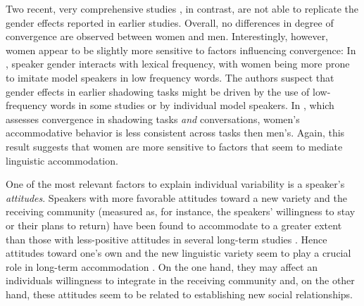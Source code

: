 \documentclass[output=paper,
modfonts
]{langscibook}
\begin{document}
% 
% 
% 
% 
Two recent, very comprehensive studies \cite{pardo_phonetic_2017,pardo_comparison_2018}, in contrast, are not able to replicate the gender effects reported in earlier studies. Overall, no differences in degree of convergence are observed between women and men. Interestingly, however, women appear to be slightly more sensitive to factors influencing convergence: In \cite{pardo_phonetic_2017}, speaker gender interacts with lexical frequency, with women being more prone to imitate model speakers in low frequency words. The authors suspect that gender effects in earlier shadowing tasks might be driven by the use of low-frequency words in some studies or by individual model speakers. In \cite{pardo_comparison_2018}, which assesses convergence in shadowing tasks \textit{and} conversations, women's accommodative behavior is less consistent across tasks then men's. Again, this result suggests that women are more sensitive to factors that seem to mediate linguistic accommodation.
% 
% 

One of the most relevant factors to explain individual variability is a speaker's \textit{attitudes}. Speakers with more favorable attitudes toward a new variety and the receiving community (measured as, for instance, the speakers' willingness to stay or their plans to return) have been found to accommodate to a greater extent than those with less-positive attitudes in several long-term studies \citep{VandenBerg1988,werlen_zwischen_2006,pesqueira_cambio_2008,romera_prosodic_2013,Mick2013,reubold_dissociating_2015}.  
% 
% 
% 
%
Hence attitudes toward one's own and the new linguistic variety seem to play a crucial role in long-term accommodation \citep[see][]{Caravedo2010}. On the one hand, they may affect an individuals willingness to integrate in the receiving community and, on the other hand, these attitudes seem to be related to establishing new social relationships.
\end{document}
